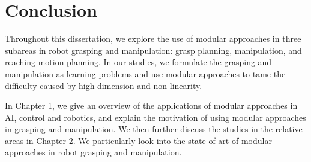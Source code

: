 \chapter{Conclusion}
\label{cha7}

Throughout this dissertation, we explore the use of modular approaches in three subareas in robot grasping and manipulation: grasp planning, manipulation, and reaching motion planning. In our studies, we formulate the grasping and manipulation as learning problems and use modular approaches to tame the difficulty caused by high dimension and non-linearity.
%


In Chapter 1, we give an overview of the applications of modular approaches in AI, control and robotics, and explain the motivation of using modular approaches in grasping and manipulation. We then further discuss the studies in the relative areas in Chapter 2. We particularly look into the state of art of modular approaches in robot grasping and manipulation.

